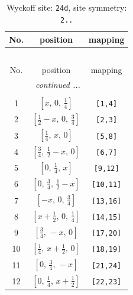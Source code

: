 \documentclass[fleqn,8pt]{jsarticle}
\begin{document}
\begin{longtable}{ccc}
\caption{Wyckoff site: {\tt 24d}, site symmetry: {\tt 2..}}
 \\
 \hline \hline
No. & position & mapping \\ \hline \endfirsthead

\multicolumn{2}{l}{\tablename\ \thetable{}} \\
 \hline \hline
No. & position & mapping \\ \hline \endhead

 \hline \hline
\multicolumn{2}{r}{\footnotesize\it continued ...} \\ \endfoot

 \hline \hline
\multicolumn{2}{r}{} \\ \endlastfoot

1 & $\left[ x,\, 0,\, \frac{1}{4} \right]$ & {\tt [1,4]} \\ \hline
2 & $\left[ \frac{1}{2} - x,\, 0,\, \frac{3}{4} \right]$ & {\tt [2,3]} \\ \hline
3 & $\left[ \frac{1}{4},\, x,\, 0 \right]$ & {\tt [5,8]} \\ \hline
4 & $\left[ \frac{3}{4},\, \frac{1}{2} - x,\, 0 \right]$ & {\tt [6,7]} \\ \hline
5 & $\left[ 0,\, \frac{1}{4},\, x \right]$ & {\tt [9,12]} \\ \hline
6 & $\left[ 0,\, \frac{3}{4},\, \frac{1}{2} - x \right]$ & {\tt [10,11]} \\ \hline
7 & $\left[ - x,\, 0,\, \frac{3}{4} \right]$ & {\tt [13,16]} \\ \hline
8 & $\left[ x + \frac{1}{2},\, 0,\, \frac{1}{4} \right]$ & {\tt [14,15]} \\ \hline
9 & $\left[ \frac{3}{4},\, - x,\, 0 \right]$ & {\tt [17,20]} \\ \hline
10 & $\left[ \frac{1}{4},\, x + \frac{1}{2},\, 0 \right]$ & {\tt [18,19]} \\ \hline
11 & $\left[ 0,\, \frac{3}{4},\, - x \right]$ & {\tt [21,24]} \\ \hline
12 & $\left[ 0,\, \frac{1}{4},\, x + \frac{1}{2} \right]$ & {\tt [22,23]} \\
\end{longtable}
\renewcommand{\arraystretch}{1.2}
\end{document}
